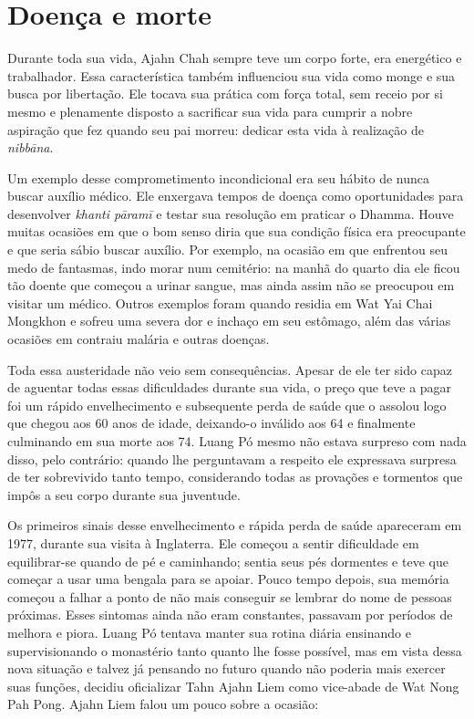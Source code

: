 \chapter{Doença e morte}

Durante toda sua vida, Ajahn Chah sempre teve um corpo forte, era
energético e trabalhador. Essa característica também influenciou sua
vida como monge e sua busca por libertação. Ele tocava sua prática com
força total, sem receio por si mesmo e plenamente disposto a sacrificar
sua vida para cumprir a nobre aspiração que fez quando seu pai morreu:
dedicar esta vida à realização de \emph{nibbāna}.

Um exemplo desse comprometimento incondicional era seu hábito de nunca
buscar auxílio médico. Ele enxergava tempos de doença como oportunidades
para desenvolver \emph{khanti pāramī} e testar sua resolução em praticar
o Dhamma. Houve muitas ocasiões em que o bom senso diria que sua
condição física era preocupante e que seria sábio buscar auxílio. Por
exemplo, na ocasião em que enfrentou seu medo de fantasmas, indo morar
num cemitério: na manhã do quarto dia ele ficou tão doente que começou a
urinar sangue, mas ainda assim não se preocupou em visitar um médico.
Outros exemplos foram quando residia em Wat Yai Chai Mongkhon e sofreu
uma severa dor e inchaço em seu estômago, além das várias ocasiões em
contraiu malária e outras doenças.

Toda essa austeridade não veio sem consequências. Apesar de ele ter sido
capaz de aguentar todas essas dificuldades durante sua vida, o preço que
teve a pagar foi um rápido envelhecimento e subsequente perda de saúde
que o assolou logo que chegou aos 60 anos de idade, deixando-o inválido
aos 64 e finalmente culminando em sua morte aos 74. Luang Pó mesmo não
estava surpreso com nada disso, pelo contrário: quando lhe perguntavam a
respeito ele expressava surpresa de ter sobrevivido tanto tempo,
considerando todas as provações e tormentos que impôs a seu corpo
durante sua juventude.

Os primeiros sinais desse envelhecimento e rápida perda de saúde
apareceram em 1977, durante sua visita à Inglaterra. Ele começou a
sentir dificuldade em equilibrar-se quando de pé e caminhando; sentia
seus pés dormentes e teve que começar a usar uma bengala para se apoiar.
Pouco tempo depois, sua memória começou a falhar a ponto de não mais
conseguir se lembrar do nome de pessoas próximas. Esses sintomas ainda
não eram constantes, passavam por períodos de melhora e piora. Luang Pó
tentava manter sua rotina diária ensinando e supervisionando o
monastério tanto quanto lhe fosse possível,
mas em vista dessa nova situação e talvez já pensando no futuro quando
não poderia mais exercer suas funções, decidiu oficializar Tahn Ajahn
Liem como vice-abade de Wat Nong Pah Pong. Ajahn Liem falou um pouco
sobre a ocasião:

